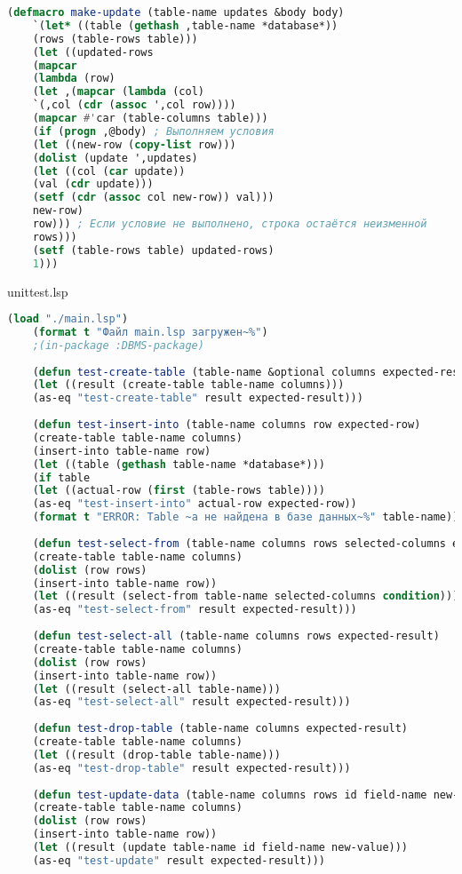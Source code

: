 \begin{lstlisting}[language=Lisp]
	(defmacro make-update (table-name updates &body body)
	`(let* ((table (gethash ,table-name *database*))
	(rows (table-rows table)))
	(let ((updated-rows
	(mapcar
	(lambda (row)
	(let ,(mapcar (lambda (col)
	`(,col (cdr (assoc ',col row))))
	(mapcar #'car (table-columns table)))
	(if (progn ,@body) ; Выполняем условия
	(let ((new-row (copy-list row)))
	(dolist (update ',updates)
	(let ((col (car update))
	(val (cdr update)))
	(setf (cdr (assoc col new-row)) val)))
	new-row)
	row))) ; Если условие не выполнено, строка остаётся неизменной
	rows)))
	(setf (table-rows table) updated-rows)
	1)))
\end{lstlisting} 

unittest.lsp
\begin{lstlisting}[language=Lisp]
	(load "./main.lsp")
	(format t "Файл main.lsp загружен~%")
	;(in-package :DBMS-package)
	
	(defun test-create-table (table-name &optional columns expected-result)
	(let ((result (create-table table-name columns)))
	(as-eq "test-create-table" result expected-result)))
	
	(defun test-insert-into (table-name columns row expected-row)
	(create-table table-name columns)
	(insert-into table-name row)
	(let ((table (gethash table-name *database*)))
	(if table
	(let ((actual-row (first (table-rows table))))
	(as-eq "test-insert-into" actual-row expected-row))
	(format t "ERROR: Table ~a не найдена в базе данных~%" table-name))))
	
	(defun test-select-from (table-name columns rows selected-columns expected-result &optional condition)
	(create-table table-name columns)
	(dolist (row rows)
	(insert-into table-name row))
	(let ((result (select-from table-name selected-columns condition)))
	(as-eq "test-select-from" result expected-result)))
	
	(defun test-select-all (table-name columns rows expected-result)
	(create-table table-name columns)
	(dolist (row rows)
	(insert-into table-name row))
	(let ((result (select-all table-name)))
	(as-eq "test-select-all" result expected-result)))
	
	(defun test-drop-table (table-name columns expected-result)
	(create-table table-name columns)
	(let ((result (drop-table table-name)))
	(as-eq "test-drop-table" result expected-result)))
	
	(defun test-update-data (table-name columns rows id field-name new-value expected-result)
	(create-table table-name columns)
	(dolist (row rows)
	(insert-into table-name row))
	(let ((result (update table-name id field-name new-value))) 
	(as-eq "test-update" result expected-result)))
	

\end{lstlisting}
